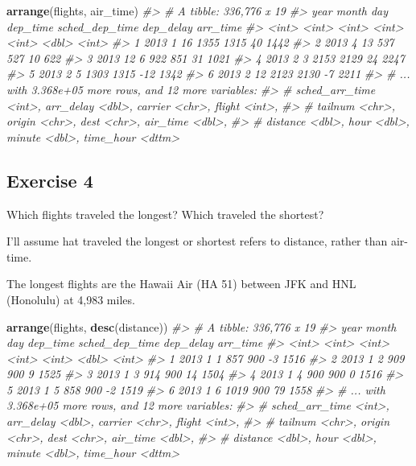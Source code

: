 \documentclass[]{book}
\newenvironment{Shaded}{\begin{snugshade}}{\end{snugshade}}
\newcommand{\CommentTok}[1]{\textcolor[rgb]{0.56,0.35,0.01}{\textit{#1}}}
\newcommand{\KeywordTok}[1]{\textcolor[rgb]{0.13,0.29,0.53}{\textbf{#1}}}
\newcommand{\NormalTok}[1]{#1}
\theoremstyle{plain}
\theoremstyle{remark}
\theoremstyle{definition}
\theoremstyle{definition}
\theoremstyle{definition}
\theoremstyle{remark}
\begin{document}
\begin{Shaded}
\begin{Highlighting}[]
\KeywordTok{arrange}\NormalTok{(flights, air_time)}
\CommentTok{#> # A tibble: 336,776 x 19}
\CommentTok{#>    year month   day dep_time sched_dep_time dep_delay arr_time}
\CommentTok{#>   <int> <int> <int>    <int>          <int>     <dbl>    <int>}
\CommentTok{#> 1  2013     1    16     1355           1315        40     1442}
\CommentTok{#> 2  2013     4    13      537            527        10      622}
\CommentTok{#> 3  2013    12     6      922            851        31     1021}
\CommentTok{#> 4  2013     2     3     2153           2129        24     2247}
\CommentTok{#> 5  2013     2     5     1303           1315       -12     1342}
\CommentTok{#> 6  2013     2    12     2123           2130        -7     2211}
\CommentTok{#> # ... with 3.368e+05 more rows, and 12 more variables:}
\CommentTok{#> #   sched_arr_time <int>, arr_delay <dbl>, carrier <chr>, flight <int>,}
\CommentTok{#> #   tailnum <chr>, origin <chr>, dest <chr>, air_time <dbl>,}
\CommentTok{#> #   distance <dbl>, hour <dbl>, minute <dbl>, time_hour <dttm>}
\end{Highlighting}
\end{Shaded}

\hypertarget{exercise-4-4}{%
\subsection{Exercise 4}\label{exercise-4-4}}

Which flights traveled the longest? Which traveled the shortest?

I'll assume hat traveled the longest or shortest refers to distance,
rather than air-time.

The longest flights are the Hawaii Air (HA 51) between JFK and HNL
(Honolulu) at 4,983 miles.

\begin{Shaded}
\begin{Highlighting}[]
\KeywordTok{arrange}\NormalTok{(flights, }\KeywordTok{desc}\NormalTok{(distance))}
\CommentTok{#> # A tibble: 336,776 x 19}
\CommentTok{#>    year month   day dep_time sched_dep_time dep_delay arr_time}
\CommentTok{#>   <int> <int> <int>    <int>          <int>     <dbl>    <int>}
\CommentTok{#> 1  2013     1     1      857            900        -3     1516}
\CommentTok{#> 2  2013     1     2      909            900         9     1525}
\CommentTok{#> 3  2013     1     3      914            900        14     1504}
\CommentTok{#> 4  2013     1     4      900            900         0     1516}
\CommentTok{#> 5  2013     1     5      858            900        -2     1519}
\CommentTok{#> 6  2013     1     6     1019            900        79     1558}
\CommentTok{#> # ... with 3.368e+05 more rows, and 12 more variables:}
\CommentTok{#> #   sched_arr_time <int>, arr_delay <dbl>, carrier <chr>, flight <int>,}
\CommentTok{#> #   tailnum <chr>, origin <chr>, dest <chr>, air_time <dbl>,}
\CommentTok{#> #   distance <dbl>, hour <dbl>, minute <dbl>, time_hour <dttm>}
\end{Highlighting}
\end{Shaded}
\end{document}
